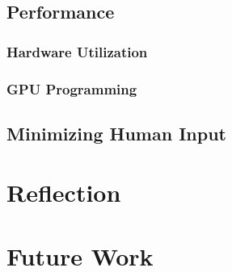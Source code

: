 \documentclass[12pt]{article}
\begin{document}
    \subsection{Performance}\label{subsec:performance}


    \subsubsection{Hardware Utilization}\label{subsubsec:hardware-utilization}


    \subsubsection{GPU Programming}\label{subsubsec:gpu-programming}

    \subsection{Minimizing Human Input}\label{subsec:minimizing-human-input}


    \pagebreak


    \section{Reflection}\label{sec:reflection}


    \pagebreak


    \section{Future Work}\label{sec:future-work}
\end{document}

